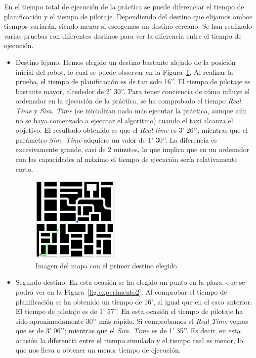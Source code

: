En el tiempo total de ejecución de la práctica se puede diferenciar el tiempo de planificación y el tiempo de pilotaje. Dependiendo del destino que elijamos ambos tiempos variarán, siendo menor si escogemos un destino cercano. Se han realizado varias pruebas con diferentes destinos para ver la diferencia entre el tiempo de ejecución.

\begin{itemize}
\item Destino lejano. Hemos elegido un destino bastante alejado de la posición inicial del robot, lo cual se puede observar en la Figura~\ref{fig.experimento1}. Al realizar la prueba, el tiempo de planificación es de tan solo 16’’. El tiempo de pilotaje es bastante mayor, alrededor de 2’ 30’’. Para tener conciencia de cómo influye el ordenador en la ejecución de la práctica, se ha comprobado el tiempo \textit{Real Time} y \textit{Sim. Time} (se inicializan nada más ejecutar la práctica, aunque aún no se haya comenzado a ejecutar el algoritmo) cuando el taxi alcanza el objetivo. El resultado obtenido es que el \textit{Real time} es 3’ 26’’; mientras que el parámetro \textit{Sim. Time} adquiere un valor de 1’ 30’’. La diferencia es excesivamente grande, casi de 2 minutos, lo que implica que en un ordenador con las capacidades al máximo el tiempo de ejecución sería relativamente corto.

\begin{figure}[H]
  \begin{center}
    \includegraphics[width=0.4\textwidth]{figures/GPP/Experimento1.png}
		\caption{Imagen del mapa con el primer destino elegido}
		\label{fig.experimento1}
		\end{center}
\end{figure}

\item Segundo destino: En esta ocasión se ha elegido un punto en la plaza, que se podrá ver en la Figura~\ref{fig.experimento2}. Al comprobar el tiempo de planificación se ha obtenido un tiempo de 16’, al igual que en el caso anterior. El tiempo de pilotaje es de 1’ 57’’. En esta ocasión el tiempo de pilotaje ha sido aproximadamente 30’’ más rápido. Si comprobamos el \textit{Real Time} vemos que es de 3’ 06’’; mientras que el \textit{Sim. Time} es de 1’ 35’’. Es decir, en esta ocasión la diferencia entre el tiempo simulado y el tiempo real es menor, lo que nos lleva a obtener un menor tiempo de ejecución.


\end{itemize}
